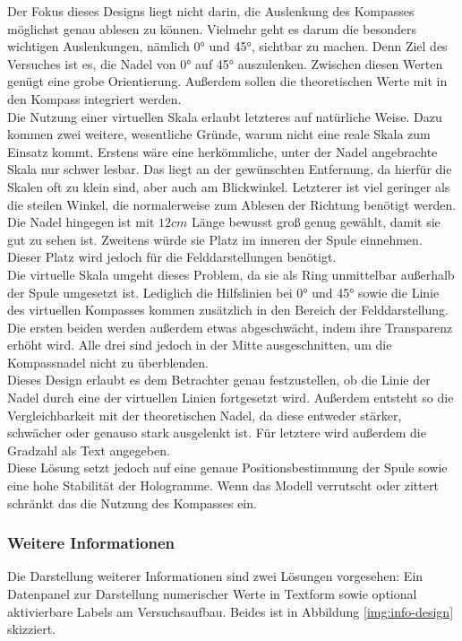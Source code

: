 Der Fokus dieses Designs liegt nicht darin, die Auslenkung des Kompasses möglichst genau ablesen zu können. Vielmehr geht es darum die besonders wichtigen Auslenkungen, nämlich 0° und 45°, sichtbar zu machen. Denn Ziel des Versuches ist es, die Nadel von 0° auf 45° auszulenken. Zwischen diesen Werten genügt eine grobe Orientierung. Außerdem sollen die theoretischen Werte mit in den Kompass integriert werden.\\

Die Nutzung einer virtuellen Skala erlaubt letzteres auf natürliche Weise. Dazu kommen zwei weitere, wesentliche Gründe, warum nicht eine reale Skala zum Einsatz kommt. Erstens wäre eine herkömmliche, unter der Nadel angebrachte Skala nur schwer lesbar. Das liegt an der gewünschten Entfernung, da hierfür die Skalen oft zu klein sind, aber auch am Blickwinkel. Letzterer ist viel geringer als die steilen Winkel, die normalerweise zum Ablesen der Richtung benötigt werden. Die Nadel hingegen ist mit $12 cm$ Länge bewusst groß genug gewählt, damit sie gut zu sehen ist. Zweitens würde sie Platz im inneren der Spule einnehmen. Dieser Platz wird jedoch für die Felddarstellungen benötigt.\\

Die virtuelle Skala umgeht dieses Problem, da sie als Ring unmittelbar außerhalb der Spule umgesetzt ist. Lediglich die Hilfslinien bei 0° und 45° sowie die Linie des virtuellen Kompasses kommen zusätzlich in den Bereich der Felddarstellung. Die ersten beiden werden außerdem etwas abgeschwächt, indem ihre Transparenz erhöht wird. Alle drei sind jedoch in der Mitte ausgeschnitten, um die Kompassnadel nicht zu überblenden.\\

Dieses Design erlaubt es dem Betrachter genau festzustellen, ob die Linie der Nadel durch eine der virtuellen Linien fortgesetzt wird. Außerdem entsteht so die Vergleichbarkeit mit der theoretischen Nadel, da diese entweder stärker, schwächer oder genauso stark ausgelenkt ist. Für letztere wird außerdem die Gradzahl als Text angegeben.\\

Diese Lösung setzt jedoch auf eine genaue Positionsbestimmung der Spule sowie eine hohe Stabilität der Hologramme. Wenn das Modell verrutscht oder zittert schränkt das die Nutzung des Kompasses ein.\\

\subsubsection{Weitere Informationen} %
Die Darstellung weiterer Informationen sind zwei Lösungen vorgesehen: Ein Datenpanel zur Darstellung numerischer Werte in Textform sowie optional aktivierbare Labels am Versuchsaufbau. Beides ist in Abbildung \ref{img:info-design} skizziert.


